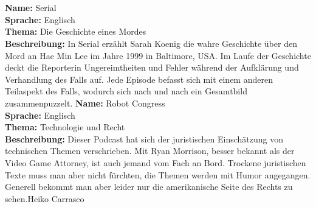 {\vfill~\\\columnbreak\\
\textbf{Name: }Serial\\
\textbf{Sprache: }Englisch\\
\textbf{Thema: }Die Geschichte eines Mordes\\
\textbf{Beschreibung: }In Serial erzählt Sarah Koenig die wahre Geschichte über den Mord an Hae Min Lee im Jahre 1999 in Baltimore, USA. Im Laufe der Geschichte deckt die Reporterin Ungereimtheiten und
Fehler während der Aufklärung und Verhandlung des Falls auf. Jede Episode befasst sich mit einem anderen Teilaspekt des Falls, wodurch sich nach und nach ein Gesamtbild zusammenpuzzelt.
\vfill\columnbreak
\textbf{Name: }Robot Congress\\
\textbf{Sprache: }Englisch\\
\textbf{Thema: }Technologie und Recht\\
\textbf{Beschreibung: } Dieser Podcast hat sich der juristischen Einschätzung von technischen Themen verschrieben. Mit Ryan Morrison, besser bekannt als der Video Game Attorney, ist auch jemand vom Fach an Bord. Trockene juristischen Texte muss man aber nicht fürchten, die Themen werden mit Humor angegangen. Generell bekommt man aber leider nur die amerikanische Seite des Rechts zu sehen.}{Heiko Carrasco}
